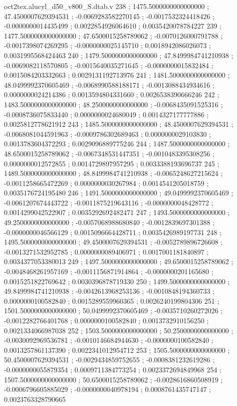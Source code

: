 \begin{filecontents}[overwrite]{oct2tex.alucyl_d50_v800_S.dtab.v}
238 ; 1475.5000000000000000 ; 47.4500007629394531 ; -0.0069283582270145 ; -0.0017532324418426 ; -0.0000000014435499 ; 0.0022854926064610 ; 0.0035420078784227
239 ; 1477.5000000000000000 ; 47.6500015258789062 ; -0.0070126000791788 ; -0.0017398074269295 ; -0.0000000025145710 ; 0.0018942086026073 ; 0.0031995568424463
240 ; 1479.5000000000000000 ; 47.8499984741210938 ; -0.0069082118570805 ; -0.0015640035271645 ; -0.0000000015832484 ; 0.0015084203332663 ; 0.0029131192713976
241 ; 1481.5000000000000000 ; 48.0499992370605469 ; -0.0068990588188171 ; -0.0013088434934616 ; 0.0000000024214386 ; 0.0013594804331660 ; 0.0026538390666246
242 ; 1483.5000000000000000 ; 48.2500000000000000 ; -0.0068435091525316 ; -0.0008736075833440 ; 0.0000000024680049 ; 0.0014327177777886 ; 0.0025812778621912
243 ; 1485.5000000000000000 ; 48.4500007629394531 ; -0.0068081044591963 ; -0.0009786302689463 ; 0.0000000029103830 ; 0.0013783604372293 ; 0.0029096889775246
244 ; 1487.5000000000000000 ; 48.6500015258789062 ; -0.0067348531447351 ; -0.0010483395308256 ; 0.0000000012572855 ; 0.0014729897957295 ; 0.0033388193696737
245 ; 1489.5000000000000000 ; 48.8499984741210938 ; -0.0065248627215624 ; -0.0011258665472269 ; 0.0000000030267984 ; 0.0014541205018759 ; 0.0035176724195480
246 ; 1491.5000000000000000 ; 49.0499992370605469 ; -0.0061207674443722 ; -0.0011875219643116 ; -0.0000000048428772 ; 0.0014299042522907 ; 0.0035292692482471
247 ; 1493.5000000000000000 ; 49.2500000000000000 ; -0.0057068988680840 ; -0.0012839697301388 ; -0.0000000046566129 ; 0.0015096664428711 ; 0.0035426989197731
248 ; 1495.5000000000000000 ; 49.4500007629394531 ; -0.0052789896726608 ; -0.0013271532952785 ; 0.0000000089406971 ; 0.0017001181840897 ; 0.0034377053380013
249 ; 1497.5000000000000000 ; 49.6500015258789062 ; -0.0048468261957169 ; -0.0011156871914864 ; -0.0000000201165680 ; 0.0015251822769642 ; 0.0030396878719330
250 ; 1499.5000000000000000 ; 49.8499984741210938 ; -0.0042613968253136 ; -0.0010848194360733 ; 0.0000000100582840 ; 0.0015289559960365 ; 0.0026240199804306
251 ; 1501.5000000000000000 ; 50.0499992370605469 ; -0.0035710260272026 ; -0.0012282766401768 ; 0.0000000100582840 ; 0.0013732910156250 ; 0.0021334066987038
252 ; 1503.5000000000000000 ; 50.2500000000000000 ; -0.0030092969536781 ; -0.0010146684944630 ; -0.0000000100582840 ; 0.0013257861137390 ; 0.0022341012954712
253 ; 1505.5000000000000000 ; 50.4500007629394531 ; -0.0029434859752655 ; -0.0008381232619286 ; -0.0000000055879354 ; 0.0009711384773254 ; 0.0023372694849968
254 ; 1507.5000000000000000 ; 50.6500015258789062 ; -0.0028616860508919 ; -0.0006796605885029 ; -0.0000000040978194 ; 0.0008761435747147 ; 0.0023763328790665

\end{filecontents}
